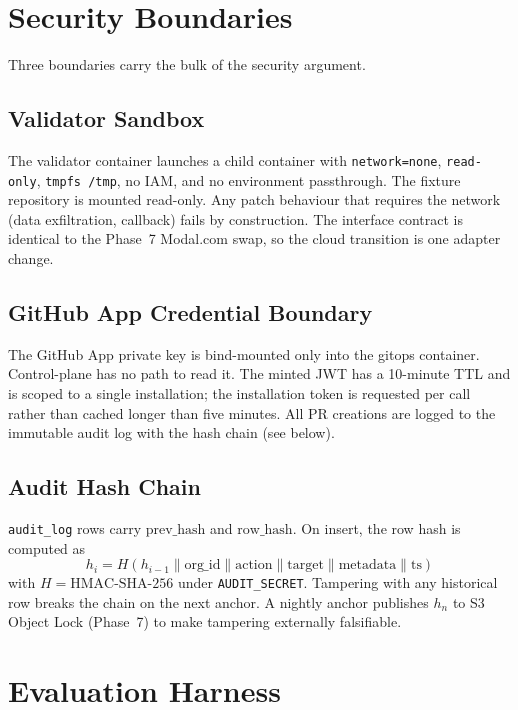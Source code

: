 \documentclass[manuscript,nonacm=true,screen=false,review=false]{acmart}
\begin{document}
\section{Security Boundaries}

Three boundaries carry the bulk of the security argument.

\subsection{Validator Sandbox}
The validator container launches a child container with \texttt{\-\-network=none}, \texttt{\-\-read-only}, \texttt{\-\-tmpfs /tmp}, no IAM, and no environment passthrough. The fixture repository is mounted read-only. Any patch behaviour that requires the network (data exfiltration, callback) fails by construction. The interface contract is identical to the Phase~7 Modal.com swap, so the cloud transition is one adapter change.

\subsection{GitHub App Credential Boundary}
The GitHub App private key is bind-mounted only into the gitops container. Control-plane has no path to read it. The minted JWT has a 10-minute TTL and is scoped to a single installation; the installation token is requested per call rather than cached longer than five minutes. All PR creations are logged to the immutable audit log with the hash chain (see below).

\subsection{Audit Hash Chain}
\texttt{audit\_log} rows carry \(\text{prev\_hash}\) and \(\text{row\_hash}\). On insert, the row hash is computed as
\[
h_i = H(h_{i-1} \| \text{org\_id} \| \text{action} \| \text{target} \| \text{metadata} \| \text{ts})
\]
with $H = \text{HMAC-SHA-256}$ under \texttt{AUDIT\_SECRET}. Tampering with any historical row breaks the chain on the next anchor. A nightly anchor publishes $h_n$ to S3 Object Lock (Phase~7) to make tampering externally falsifiable.

\section{Evaluation Harness}\label{sec:eval}
\end{document}

